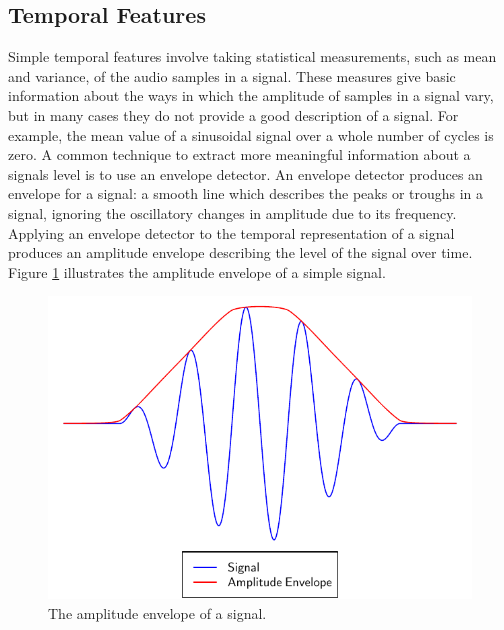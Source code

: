 	\subsection{Temporal Features}
	\label{sec:Timbre-LowLevelFeatures-Temporal}
		Simple temporal features involve taking statistical measurements, such as mean and variance, of the audio
		samples in a signal. These measures give basic information about the ways in which the amplitude of samples
		in a signal vary, but in many cases they do not provide a good description of a signal. For example, the
		mean value of a sinusoidal signal over a whole number of cycles is zero. A common technique to extract more
		meaningful information about a signals level is to use an envelope detector. An envelope detector produces
		an envelope for a signal: a smooth line which describes the peaks or troughs in a signal, ignoring the
		oscillatory changes in amplitude due to its frequency. Applying an envelope detector to the temporal
		representation of a signal produces an amplitude envelope describing the level of the signal over time.
		Figure \ref{fig:AmplitudeEnvelope} illustrates the amplitude envelope of a simple signal.

		\begin{figure}[h!]
			\centering
			\includegraphics{chapter2/Images/AmplitudeEnvelope.pdf}
			\caption{The amplitude envelope of a signal.}
			\label{fig:AmplitudeEnvelope}
		\end{figure}


